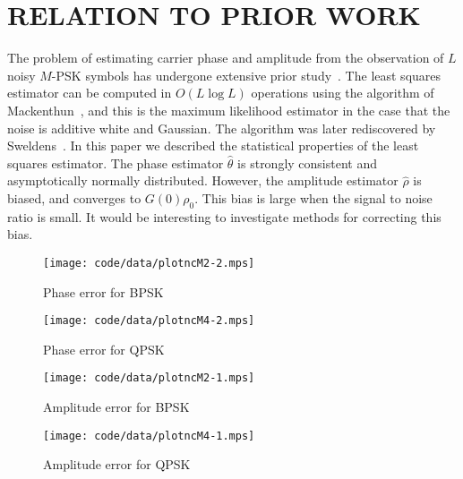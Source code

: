 \documentclass{article}
\begin{document}
\section{RELATION TO PRIOR WORK}

The problem of estimating carrier phase and amplitude from the observation of $L$ noisy $M$-PSK symbols has undergone extensive prior study~\cite{ViterbiViterbi_phase_est_1983,Cowley_ref_sym_carr_1998,Wilson1989,Makrakis1990,Liu1991,Mackenthun1994,Sweldens2001,McKilliamLinearTimeBlockPSK2009,Divsalar1990}.  The least squares estimator can be computed in $O(L\log L)$ operations using the algorithm of Mackenthun~\cite{Mackenthun1994}, and this is the maximum likelihood estimator in the case that the noise is additive white and Gaussian.  The algorithm was later rediscovered by Sweldens~\cite{Sweldens2001}.  In this paper we described the statistical properties of the least squares estimator. The phase estimator $\hat{\theta}$ is strongly consistent and asymptotically normally distributed.  However, the amplitude estimator $\hat{\rho}$ is biased, and converges to $G(0)\rho_0$.  This bias is large when the signal to noise ratio is small.  It would be interesting to investigate methods for correcting this bias. 

\begin{figure}[p]
	\centering
		\texttt{[image: code/data/plotncM2-2.mps]}
		\caption{Phase error for BPSK}
		\label{fig:plotphaseM2}
\end{figure}

\begin{figure}[p]
	\centering
		\texttt{[image: code/data/plotncM4-2.mps]}
		\caption{Phase error for QPSK}
		\label{fig:plotphaseM4}
\end{figure}

\begin{figure}[p]
	\centering
		\texttt{[image: code/data/plotncM2-1.mps]}
		\caption{Amplitude error for BPSK}
		\label{fig:plotampM2}
\end{figure}

\begin{figure}[p]
	\centering
		\texttt{[image: code/data/plotncM4-1.mps]}
		\caption{Amplitude error for QPSK}
		\label{fig:plotampM4}
\end{figure}


\vfill\pagebreak




\end{document}
